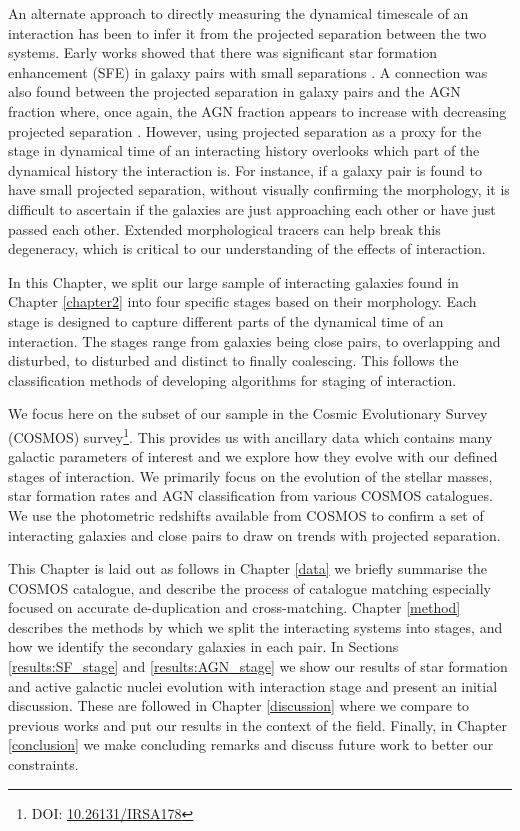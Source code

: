 An alternate approach to directly measuring the dynamical timescale of an interaction has been to infer it from the projected separation between the two systems. Early works showed that there was significant star formation enhancement (SFE) in galaxy pairs with small separations \citep{2003MNRAS.346.1189L,2008MNRAS.385.1903L, 2008AJ....135.1877E, 2022ApJ...940....4S}. A connection was also found between the projected separation in galaxy pairs and the AGN fraction where, once again, the AGN fraction appears to increase with decreasing projected separation \citep{2009MNRAS.399.2172R, 2011MNRAS.418.2043E, 2017MNRAS.465.2671G, 2021ApJ...909..124S}. However, using projected separation as a proxy for the stage in dynamical time of an interacting history overlooks which part of the dynamical history the interaction is. For instance, if a galaxy pair is found to have small projected separation, without visually confirming the morphology, it is difficult to ascertain if the galaxies are just approaching each other or have just passed each other. Extended morphological tracers can help break this degeneracy, which is critical to our understanding of the effects of interaction.

In this Chapter, we split our large sample of interacting galaxies found in Chapter \ref{chapter2} into four specific stages based on their morphology. Each stage is designed to capture different parts of the dynamical time of an interaction. The stages range from galaxies being close pairs, to overlapping and disturbed, to disturbed and distinct to finally coalescing. This follows the classification methods of developing algorithms for staging of interaction\citep{2019MNRAS.490.5390B,2022ApJ...937...97C}. 

We focus here on the subset of our sample in the Cosmic Evolutionary Survey (COSMOS) survey\footnote{DOI: \href{https://www.ipac.caltech.edu/doi/irsa/10.26131/IRSA178}{10.26131/IRSA178}}. This provides us with ancillary data which contains many galactic parameters of interest and we explore how they evolve with our defined stages of interaction. We primarily focus on the evolution of the stellar masses, star formation rates and AGN classification from various COSMOS catalogues. We use the photometric redshifts available from COSMOS to confirm a set of interacting galaxies and close pairs to draw on trends with projected separation.

This Chapter is laid out as follows in Chapter \ref{data} we briefly summarise the COSMOS catalogue, and describe the process of catalogue matching especially focused on accurate de-duplication and cross-matching. Chapter \ref{method} describes the methods by which we split the interacting systems into stages, and how we identify the secondary galaxies in each pair. In Sections \ref{results:SF_stage} and \ref{results:AGN_stage} we show our results of star formation and active galactic nuclei evolution with interaction stage and present an initial discussion. These are followed in Chapter \ref{discussion} where we compare to previous works and put our results in the context of the field. Finally, in Chapter \ref{conclusion} we make concluding remarks and discuss future work to better our constraints. 


